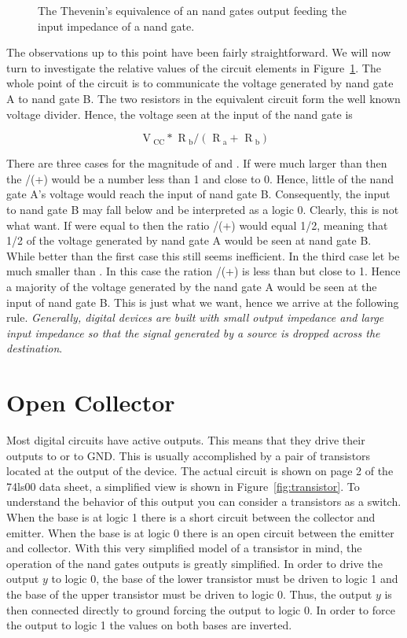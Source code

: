 \begin{figure}[ht]
\caption{The Thevenin's equivalence of an nand gates output feeding the
input impedance of a nand gate.}
\label{fig:impedance}
\end{figure}

The observations up to this point have been fairly straightforward.
We will now turn to investigate the relative values of the circuit
elements in Figure~\ref{fig:impedance}.  The whole point of the
circuit is to communicate the voltage generated by nand gate A to
nand gate B.  The two resistors in the equivalent circuit form the
well known voltage divider.  Hence, the voltage seen at the input
of the nand gate is 

    $$ \text{ V}_\text{ CC}  *
        \text{ R}_\text{ b}  / 
        ( \text{ R}_\text{ a} + \text{ R}_\text{ b} ) $$


There are three
cases for the magnitude of \Ra and \Rb.  If \Ra were much larger
than \Rb then the \Rb/(\Ra+\Rb) would be a number less than 1 
and close to 0.  Hence, little of the nand gate A's voltage 
would reach the input of nand gate B.  Consequently, the input
to nand gate B may fall below \VIL and be interpreted as a logic
0.  Clearly, this is not
what want.  If \Ra were equal to \Rb then the ratio \Rb/(\Ra+\Rb) 
would equal 1/2, meaning that 1/2 of the voltage generated by nand
gate A would be seen at nand gate B.  While better than the first
case this still seems inefficient.  In the third case let
\Ra be much smaller than \Rb.  In this case the ration \Rb/(\Ra+\Rb)
is less than but close to 1.  Hence a majority of the voltage
generated by the nand gate A would be seen at the input of nand gate
B. This is just what we want, hence we arrive at the following
rule. \textit{ Generally, digital devices are built with small output
impedance and large input impedance so that the signal
generated by a source is dropped across the destination}.

\section{Open Collector}
Most digital circuits have active outputs.  This means that they drive 
their outputs to \VCC or to GND.  This is usually accomplished 
by a pair of transistors located at the output of the device.  The 
actual circuit is shown on page 2 of the 74ls00 data sheet,
a simplified view is shown in Figure~\ref{fig:transistor}.  To 
understand the behavior of this output you can consider 
a transistors as a switch.  When the base is at logic 1 there is
a short circuit between the collector and emitter.  When the base is 
at logic 0 there is an open circuit between the emitter and
collector.  With this very simplified model of a transistor in mind,
the operation of the nand gates outputs is greatly simplified.  In
order to drive the output $y$ to logic 0, the base of the lower 
transistor must be driven to logic 1 and the base of the upper
transistor must be driven to logic 0.  Thus, the output $y$ is then
connected directly to ground forcing the output to logic 0.  In order
to force the output to logic 1 the values on both bases are inverted.

